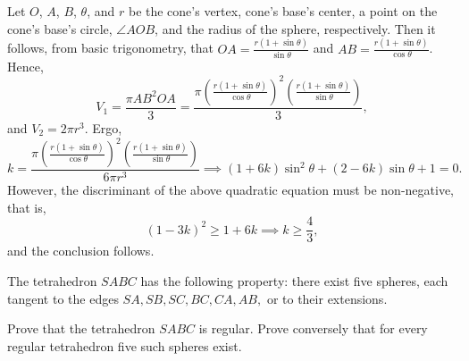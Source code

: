 \begin{solution}[name={Solution by Boxedexe}]
	Let $ O$, $ A$, $ B$, $ \theta$, and $ r$ be the cone's vertex, cone's base's center, a point on the cone's base's circle, $ \angle AOB$, and the radius of the sphere, respectively. Then it follows, from basic trigonometry, that $ OA = \frac {r(1 + \sin\theta)}{\sin\theta}$ and $ AB = \frac {r(1 + \sin\theta)}{\cos\theta}$. Hence, $$ V_1 = \frac {\pi AB^2OA}{3} = \frac {\pi\left(\frac {r(1 + \sin\theta)}{\cos\theta}\right)^2\left(\frac {r(1 + \sin\theta)}{\sin\theta}\right)}{3},$$ and $ V_2 = 2\pi r^3$. Ergo,
	\[ k = \frac {\pi\left(\frac {r(1 + \sin\theta)}{\cos\theta}\right)^2\left(\frac {r(1 + \sin\theta)}{\sin\theta}\right)}{6\pi r^3}\implies (1 + 6k)\sin^2\theta + (2 - 6k)\sin\theta + 1 = 0.
	\]
	However, the discriminant of the above quadratic equation must be non-negative, that is, $$ (1 - 3k)^2\geq 1 + 6k\implies k\geq\frac {4}{3},$$
	and the conclusion follows.
\end{solution}




\begin{question}[name={1962 International Mathematical Olympiad}]
	The tetrahedron $SABC$ has the following property: there exist five spheres, each tangent to the edges $SA, SB, SC, BC, CA, AB,$ or to their extensions.
	\begin{tasks}
		\task Prove that the tetrahedron $SABC$ is regular.
		\task Prove conversely that for every regular tetrahedron five such spheres exist.
	\end{tasks}
\end{question}

